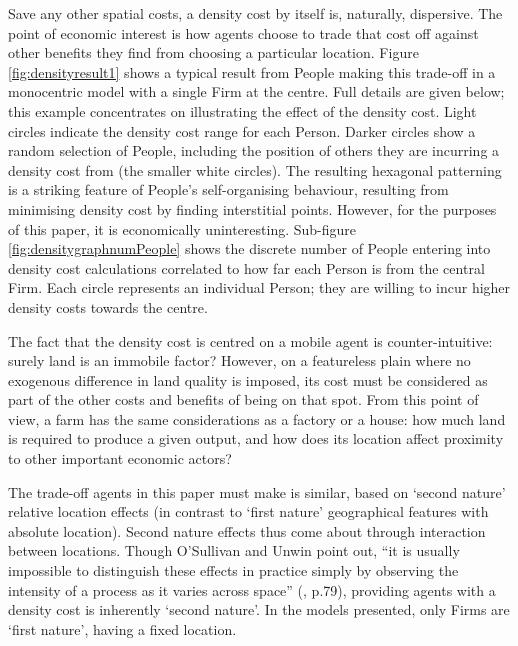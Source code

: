 Save any other spatial costs, a density cost by itself is, naturally, dispersive. The point of economic interest is how agents choose to trade that cost off against other benefits they find from choosing a particular location. Figure \ref{fig:densityresult1} shows a typical result from People making this trade-off in a monocentric model with a single Firm at the centre. Full details are given below; this example concentrates on illustrating the effect of the density cost. Light circles indicate the density cost range for each Person. Darker circles show a random selection of People, including the position of others they are incurring a density cost from (the smaller white circles). The resulting hexagonal patterning is a striking feature of People's self-organising behaviour, resulting from minimising density cost by finding interstitial points. However, for the purposes of this paper, it is economically uninteresting. Sub-figure \ref{fig:densitygraphnumPeople} shows the discrete number of People entering into density cost calculations correlated to how far each Person is from the central Firm. Each circle represents an individual Person; they are willing to incur higher density costs towards the centre.

The fact that the density cost is centred on a mobile agent is counter-intuitive: surely land is an immobile factor? However, on a featureless plain where no exogenous difference in land quality is imposed, its cost must be considered as part of the other costs and benefits of being on that spot. From this point of view, a farm has the same considerations as a factory or a house: how much land is required to produce a given output, and how does its location affect proximity to other important economic actors? 

The trade-off agents in this paper must make is similar, based on `second nature' relative location effects (in contrast to `first nature' geographical features with absolute location). Second nature effects thus come about through interaction between locations. Though O'Sullivan and Unwin point out, ``it is usually impossible to distinguish these effects in practice simply by observing the intensity of a process as it varies across space'' (\citealt{osullivan_geographic_2002}, p.79), providing agents with a density cost is inherently `second nature'. In the models presented, only Firms are `first nature', having a fixed location.

